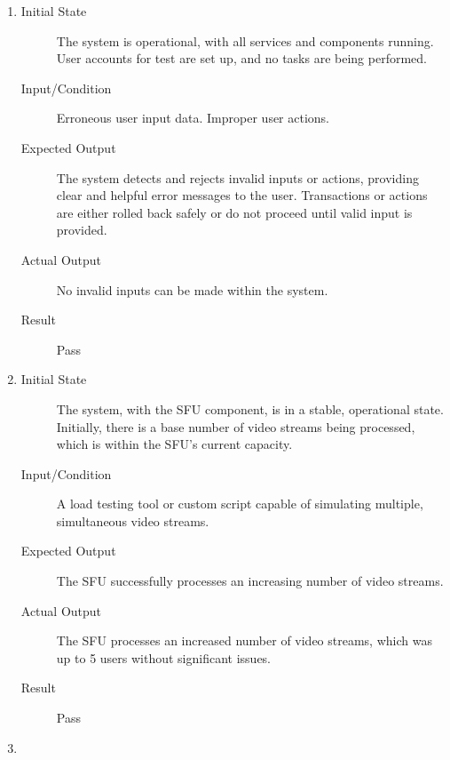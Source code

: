 \documentclass[12pt, titlepage]{article}
\begin{document}
\begin{enumerate}[NFR-T1]
  \item \label{NFRT4}
    \begin{description}
    \item[Initial State] The system is operational, with all services and
      components running. User accounts for test are set up, and no tasks are
      being performed.
    \item[Input/Condition] Erroneous user input data. Improper user actions.
    \item[Expected Output] The system detects and rejects invalid inputs or
      actions, providing clear and helpful error messages to the user.
      Transactions or actions are either rolled back safely or do not proceed
      until valid input is provided.
    \item[Actual Output] No invalid inputs can be made within the system.
    \item[Result] Pass
    \end{description}
  \item \label{NFRT6}
    \begin{description}
    \item[Initial State] The system, with the SFU component, is in a stable,
      operational state. Initially, there is a base number of video streams
      being processed, which is within the SFU's current capacity.
    \item[Input/Condition] A load testing tool or custom script capable of
      simulating multiple, simultaneous video streams.
    \item[Expected Output] The SFU successfully processes an increasing number of
      video streams.
    \item[Actual Output] The SFU processes an increased number of video streams,
      which was up to 5 users without significant issues.
    \item[Result] Pass
    \end{description}
  \item \label{NFRT7}

\end{enumerate}
\end{document}
